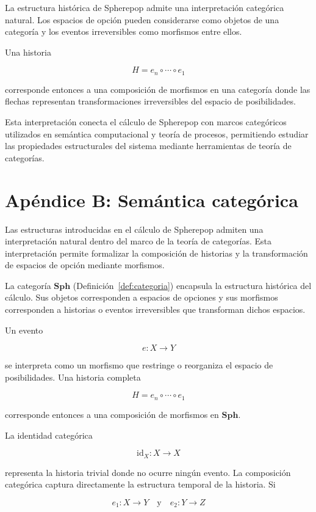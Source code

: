 \documentclass[12pt]{article}
\theoremstyle{plain}
\theoremstyle{definition}
\begin{document}
La estructura histórica de Spherepop admite una interpretación categórica natural. Los espacios de opción pueden considerarse como objetos de una categoría y los eventos irreversibles como morfismos entre ellos.

Una historia

\[
H = e_n \circ \cdots \circ e_1
\]

corresponde entonces a una composición de morfismos en una categoría donde las flechas representan transformaciones irreversibles del espacio de posibilidades.

Esta interpretación conecta el cálculo de Spherepop con marcos categóricos utilizados en semántica computacional y teoría de procesos, permitiendo estudiar las propiedades estructurales del sistema mediante herramientas de teoría de categorías.

\section{Apéndice B: Semántica categórica}
\label{ap:categorica}

Las estructuras introducidas en el cálculo de Spherepop admiten una interpretación natural dentro del marco de la teoría de categorías. Esta interpretación permite formalizar la composición de historias y la transformación de espacios de opción mediante morfismos.

La categoría $\mathbf{Sph}$ (Definición~\ref{def:categoria}) encapsula la estructura histórica del cálculo. Sus objetos corresponden a espacios de opciones y sus morfismos corresponden a historias o eventos irreversibles que transforman dichos espacios.

Un evento

\[
e : X \rightarrow Y
\]

se interpreta como un morfismo que restringe o reorganiza el espacio de posibilidades. Una historia completa

\[
H = e_n \circ \cdots \circ e_1
\]

corresponde entonces a una composición de morfismos en $\mathbf{Sph}$.

La identidad categórica

\[
\mathrm{id}_X : X \rightarrow X
\]

representa la historia trivial donde no ocurre ningún evento. La composición categórica captura directamente la estructura temporal de la historia. Si

\[
e_1 : X \rightarrow Y
\quad\text{y}\quad
e_2 : Y \rightarrow Z
\]
\end{document}
